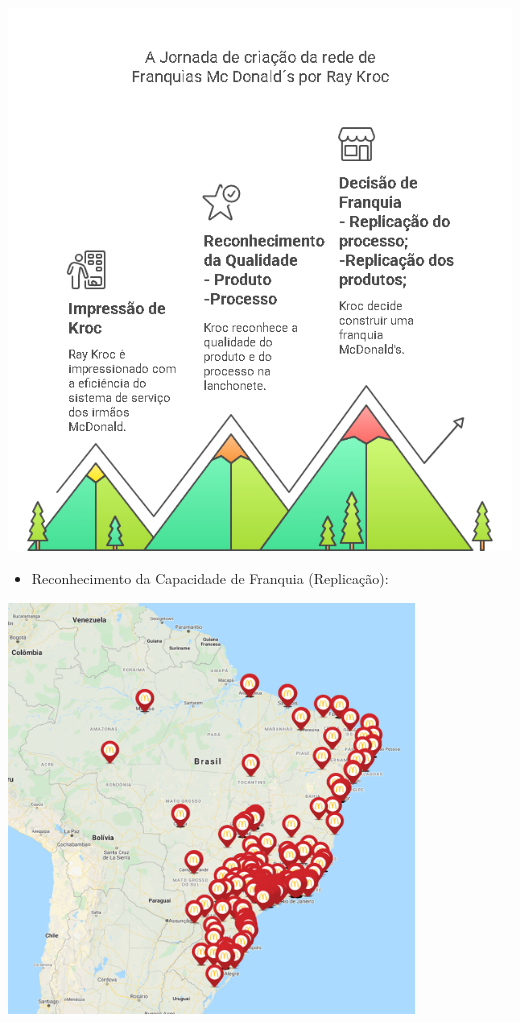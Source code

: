 \documentclass[
]{book}
\providecommand{\tightlist}{%
  \setlength{\itemsep}{0pt}\setlength{\parskip}{0pt}}
\begin{document}
\includegraphics{images/qualidade-geral/MacDonalds1.png}

\begin{itemize}
\tightlist
\item
  Reconhecimento da Capacidade de Franquia (Replicação):
\end{itemize}

\includegraphics[width=4.23958in,height=\textheight]{images/mac-donalds/Franquias.jpg}
\end{document}
